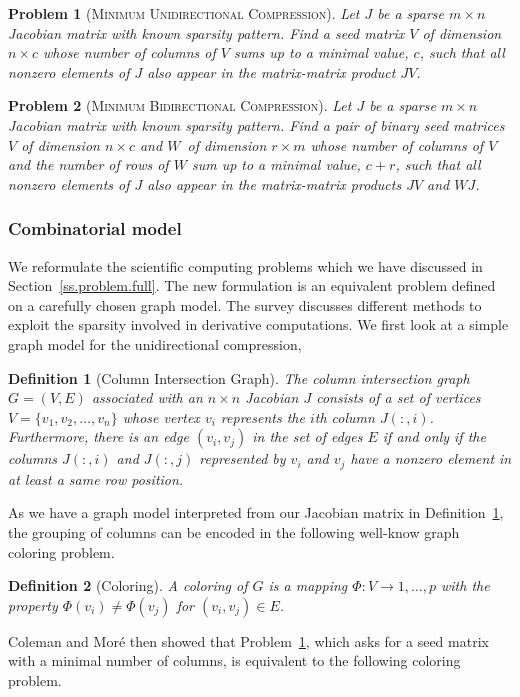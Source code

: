 \documentclass[12pt, twoside,a4paper,toc=bibliography]{scrbook}
\newtheorem{problem}{Problem}
\newtheorem{definition}{Definition}
\newcommand{\secref}[1]{Section~\protect\ref{#1}}
\newcommand{\defref}[1]{Definition~\protect\ref{#1}}
\newcommand{\col}{\ensuremath{c}}
\newcommand{\row}{\ensuremath{r}}
\newcommand{\MinUniCom}{\textsc{Minimum Unidirectional Compression}}
\newcommand{\MinBidCom}{\textsc{Minimum Bidirectional Compression}}
\begin{document}
\begin{problem}[\MinUniCom]
\label{p.seed.uni} Let $J$ be a sparse ${m\times n}$ Jacobian matrix with known sparsity
pattern. Find a seed matrix $V$ of dimension $n\times \col$
whose number of columns of $V$ sums up
to a minimal value, $\col$, such that all nonzero elements of $J$ also appear in
the matrix-matrix product $JV$.
\end{problem}

\begin{problem}[\MinBidCom]
\label{p.seed.bid} Let $J$ be a sparse ${m\times n}$ Jacobian matrix with known sparsity
pattern. Find a pair of binary seed matrices $V$ of dimension $n\times \col$ and $W$~of
dimension $\row \times m$ whose number of columns of $V$ and the number of rows of $W$ sum up to a minimal value, $\col + \row$, such that all nonzero elements of $J$ also appear in
the matrix-matrix products $JV$ and $WJ$.
\end{problem}

\subsubsection{Combinatorial model}
\label{s.modeling.full}
We reformulate the scientific computing problems which
we have discussed in \secref{ss.problem.full}.
The new formulation is an equivalent problem defined on a
carefully chosen graph model. The survey \cite{Gebremedhin05whatcolor}
discusses different methods
to exploit the sparsity involved in derivative computations.
We first look at a simple graph model for the unidirectional compression,
%
\begin{definition}[Column Intersection Graph]
\label{d:cig}
The column intersection graph $G = (V,E)$ associated with an $n \times n$ Jacobian $J$
consists of a set of vertices $V=\{v_1, v_2, \dots, v_n\}$ whose vertex $v_i$ represents
the $i$th column $J(:,i)$. Furthermore, there is an edge $(v_i,v_j)$ in the set of edges
$E$ if and only if the columns $J(:,i)$ and $J(:,j)$ represented by $v_i$ and $v_j$ have
a nonzero element in at least a same row position.
\end{definition}

As we have a graph model interpreted from our Jacobian matrix in \defref{d:cig},
the grouping of columns can be encoded in the following well-know graph coloring problem.
%
\begin{definition}[Coloring]
A coloring of $G$ is a mapping $\Phi : V \to {1, \dots, p}$ with the property
$\Phi(v_i)\neq \Phi(v_j)$ for $(v_i,v_j) \in E$.
\end{definition}
%
Coleman and Mor\'{e} \cite{Coleman1983EoS} then showed that Problem~\ref{p.seed.uni}, which
asks for a seed matrix with a minimal number of columns, is equivalent to the following
coloring problem.
\end{document}
